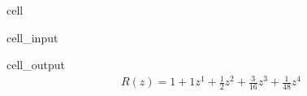 \documentclass[letterpaper,10pt,english]{jupyterBook}
\begin{document}
\begin{sphinxuseclass}{cell}
\begin{sphinxVerbatimInput}
\begin{sphinxuseclass}{cell_input}
\begin{sphinxVerbatim}[commandchars=\\\{\}]
\end{sphinxVerbatim}

\end{sphinxuseclass}\end{sphinxVerbatimInput}
\begin{sphinxVerbatimOutput}

\begin{sphinxuseclass}{cell_output}\begin{equation*}
\begin{split}\displaystyle R(z) = 1 + 1 z^1 + \frac{1}{2} z^2 + \frac{3}{16} z^3 + \frac{1}{48} z^4\end{split}
\end{equation*}
\end{sphinxuseclass}\end{sphinxVerbatimOutput}

\end{sphinxuseclass}
\end{document}
